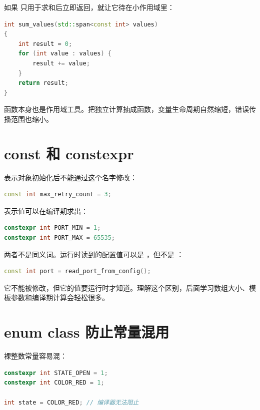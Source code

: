 如果  只用于求和后立即返回，就让它待在小作用域里：

\begin{lstlisting}[language=C++,caption={把变量限制在使用附近}]
int sum_values(std::span<const int> values)
{
    int result = 0;
    for (int value : values) {
        result += value;
    }
    return result;
}
\end{lstlisting}

函数本身也是作用域工具。把独立计算抽成函数，变量生命周期自然缩短，错误传播范围也缩小。

\section{const 和 constexpr}

 表示对象初始化后不能通过这个名字修改：

\begin{lstlisting}[language=C++,caption={const 表达不再修改}]
const int max_retry_count = 3;
\end{lstlisting}

 表示值可以在编译期求出：

\begin{lstlisting}[language=C++,caption={编译期常量}]
constexpr int PORT_MIN = 1;
constexpr int PORT_MAX = 65535;
\end{lstlisting}

两者不是同义词。运行时读到的配置值可以是 ，但不是 ：

\begin{lstlisting}[language=C++,caption={运行时 const}]
const int port = read_port_from_config();
\end{lstlisting}

它不能被修改，但它的值要运行时才知道。理解这个区别，后面学习数组大小、模板参数和编译期计算会轻松很多。

\section{enum class 防止常量混用}

裸整数常量容易混：

\begin{lstlisting}[language=C++,caption={裸整数状态不清楚}]
constexpr int STATE_OPEN = 1;
constexpr int COLOR_RED = 1;

int state = COLOR_RED; // 编译器无法阻止
\end{lstlisting}

